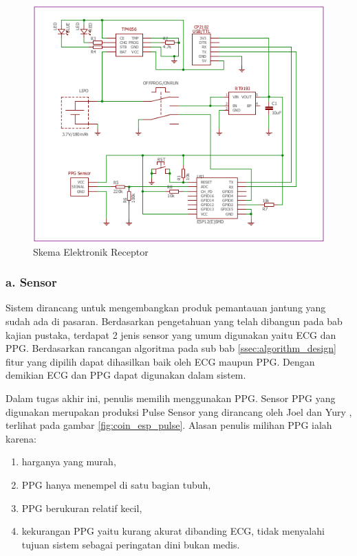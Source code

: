 \begin{figure}[H]
\centering
\includegraphics[scale=0.7]{images/schematics.png}
\caption{Skema Elektronik Receptor}
\label{fig:schematics}
\end{figure}

\subsubsection{a. Sensor}
Sistem dirancang untuk mengembangkan produk pemantauan jantung yang sudah ada di pasaran. Berdasarkan pengetahuan yang telah dibangun pada bab kajian pustaka, terdapat 2 jenis sensor yang umum digunakan yaitu ECG dan PPG. Berdasarkan rancangan algoritma pada sub bab \ref{ssec:algorithm_design} fitur yang dipilih dapat dihasilkan baik oleh ECG maupun PPG. Dengan demikian ECG dan PPG dapat digunakan dalam sistem.

Dalam tugas akhir ini, penulis memilih menggunakan PPG. Sensor PPG yang digunakan merupakan produksi Pulse Sensor yang dirancang oleh Joel dan Yury \cite{pulse_sensor}, terlihat pada gambar \ref{fig:coin_esp_pulse}. Alasan penulis milihan PPG ialah karena:
\begin{enumerate}
	\item harganya yang murah,
	\item PPG hanya menempel di satu bagian tubuh,
	\item PPG berukuran relatif kecil,
	\item kekurangan PPG yaitu kurang akurat dibanding ECG, tidak menyalahi tujuan sistem sebagai peringatan dini bukan medis.
\end{enumerate}

